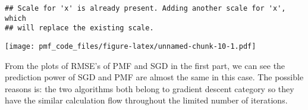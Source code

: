 \documentclass[]{article}
\begin{document}
\begin{verbatim}
## Scale for 'x' is already present. Adding another scale for 'x', which
## will replace the existing scale.
\end{verbatim}

\texttt{[image: pmf\_code\_files/figure-latex/unnamed-chunk-10-1.pdf]}

From the plots of RMSE's of PMF and SGD in the first part, we can see
the prediction power of SGD and PMF are almost the same in this case.
The possible reasons is: the two algorithms both belong to gradient
descent category so they have the similar calculation flow throughout
the limited number of iterations.
\end{document}

